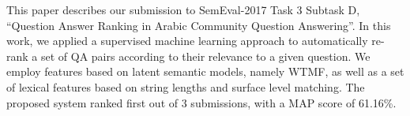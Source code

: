 This paper describes our submission to SemEval-2017 Task 3 Subtask D, ``Question Answer Ranking in Arabic Community Question Answering''. In this work, we applied a supervised machine learning approach to automatically re-rank a set of QA pairs according to their relevance to a given question. We employ features based on latent semantic models, namely WTMF, as well as a set of lexical features based on string lengths and surface level matching. The proposed system ranked first out of 3 submissions, with a MAP score of 61.16\%.
